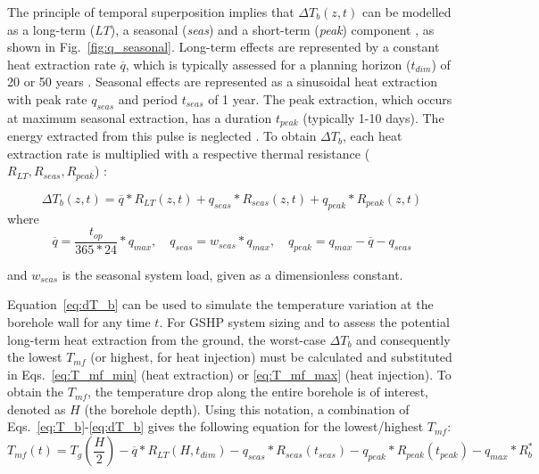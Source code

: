 The principle of temporal superposition implies that $\Delta T_b(z, t)$ can be modelled as a long-term (\textit{LT}), a seasonal (\textit{seas}) and a short-term (\textit{peak}) component \citep{claesson_conductive_1988}, as shown in Fig.~\ref{fig:q_seasonal}.
%
%
Long-term effects are represented by a constant heat extraction rate $\overline{q}$, which is typically assessed for a planning horizon ($t_\mathit{dim}$) of 20 or 50 years \cite{pahud_geothermal_2002,miglani_methodology_2018}. 
Seasonal effects are represented as a sinusoidal heat extraction with peak rate $q_\mathit{seas}$ and period $t_\mathit{seas}$ of 1 year.
The peak extraction, which occurs at maximum seasonal extraction, has a duration $t_\mathit{peak}$ (typically 1-10 days). The energy extracted from this pulse is neglected \cite{claesson_conductive_1988}. 
To obtain $\Delta T_b$, each heat extraction rate is multiplied with a respective thermal resistance ($R_{LT},R_\mathit{seas},R_\mathit{peak}$) \cite{claesson_conductive_1988}:

\begin{equation}
\label{eq:dT_b}
    \textstyle \Delta T_b(z, t) = \overline{q} * R_{LT}(z, t) + q_{seas} * R_{seas}(z,t) + q_{peak} * R_{peak}(z, t)
\end{equation}
where
\begin{equation*}
    \overline{q} = \frac{t_{op}}{365*24} * q_\mathit{max}, \quad q_\mathit{seas} = w_\mathit{seas} * q_\mathit{max}, \quad q_\mathit{peak} = q_\mathit{max} - \overline{q} - q_\mathit{seas}
\end{equation*}

and $w_\mathit{seas}$ is the seasonal system load, given as a dimensionless constant.

Equation~\ref{eq:dT_b} can be used to simulate the temperature variation at the borehole wall for any time $t$. 
For GSHP system sizing and to assess the potential long-term heat extraction from the ground, the worst-case $\Delta T_b$ and consequently the lowest $T_{mf}$ (or highest, for heat injection) must be calculated and substituted in Eqs.~\ref{eq:T_mf_min} (heat extraction) or \ref{eq:T_mf_max} (heat injection).
To obtain the $T_{mf}$, the temperature drop along the entire borehole is of interest, denoted as $H$ (the borehole depth).
Using this notation, a combination of Eqs.~\ref{eq:T_b}-\ref{eq:dT_b} gives the following equation for the lowest/highest $T_{mf}$:
\begin{equation}
\label{eq:T_mf}
   T_{mf}(t) =  \textstyle T_g\left(\frac{H}{2}\right) - \overline{q} * R_{LT}(H, t_\mathit{dim}) - q_{seas} * R_{seas}(t_\mathit{seas}) - q_{peak} * R_{peak}(t_\mathit{peak}) - q_\mathit{max}*R_b^*
\end{equation}

